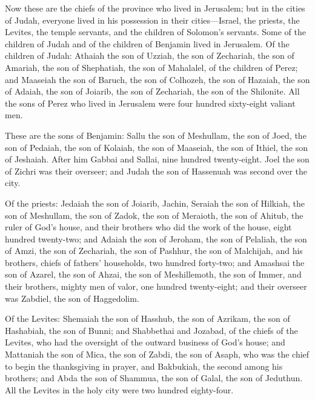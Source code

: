  Now these are the chiefs of the province who lived in
Jerusalem; but in the cities of Judah, everyone lived in his possession
in their cities---Israel, the priests, the Levites, the temple servants,
and the children of Solomon's servants.  Some of the
children of Judah and of the children of Benjamin lived in Jerusalem. Of
the children of Judah: Athaiah the son of Uzziah, the son of Zechariah,
the son of Amariah, the son of Shephatiah, the son of Mahalalel, of the
children of Perez;  and Maaseiah the son of Baruch, the son
of Colhozeh, the son of Hazaiah, the son of Adaiah, the son of Joiarib,
the son of Zechariah, the son of the Shilonite.  All the
sons of Perez who lived in Jerusalem were four hundred sixty-eight
valiant men.

 These are the sons of Benjamin: Sallu the son of Meshullam,
the son of Joed, the son of Pedaiah, the son of Kolaiah, the son of
Maaseiah, the son of Ithiel, the son of Jeshaiah.  After him
Gabbai and Sallai, nine hundred twenty-eight.  Joel the son
of Zichri was their overseer; and Judah the son of Hassenuah was second
over the city.

 Of the priests: Jedaiah the son of Joiarib, Jachin,
 Seraiah the son of Hilkiah, the son of Meshullam, the son
of Zadok, the son of Meraioth, the son of Ahitub, the ruler of God's
house,  and their brothers who did the work of the house,
eight hundred twenty-two; and Adaiah the son of Jeroham, the son of
Pelaliah, the son of Amzi, the son of Zechariah, the son of Pashhur, the
son of Malchijah,  and his brothers, chiefs of fathers'
households, two hundred forty-two; and Amashsai the son of Azarel, the
son of Ahzai, the son of Meshillemoth, the son of Immer, 
and their brothers, mighty men of valor, one hundred twenty-eight; and
their overseer was Zabdiel, the son of Haggedolim.

 Of the Levites: Shemaiah the son of Hasshub, the son of
Azrikam, the son of Hashabiah, the son of Bunni;  and
Shabbethai and Jozabad, of the chiefs of the Levites, who had the
oversight of the outward business of God's house;  and
Mattaniah the son of Mica, the son of Zabdi, the son of Asaph, who was
the chief to begin the thanksgiving in prayer, and Bakbukiah, the second
among his brothers; and Abda the son of Shammua, the son of Galal, the
son of Jeduthun.  All the Levites in the holy city were two
hundred eighty-four.

